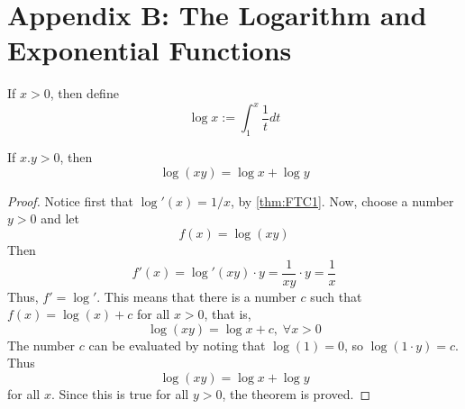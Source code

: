 %
\section*{Appendix B: The Logarithm and Exponential Functions}
%

    
\begin{definition}
    If $x > 0$, then define \begin{equation}
        \log x := \int_1^x\frac{1}{t}dt
    \end{equation}
\end{definition}

\begin{theorem}
    If $x.y > 0$, then \begin{equation}
        \log(xy) = \log x+ \log y
    \end{equation}
\end{theorem}
\begin{proof}
    Notice first that $\log'(x) = 1/x$, by \ref{thm:FTC1}. Now, choose a number $y > 0$ and let \begin{equation*}
        f(x) = \log(xy)
    \end{equation*}
    Then\begin{equation*}
        f'(x) = \log'(xy)\cdot y = \frac{1}{xy}\cdot y = \frac{1}{x}
    \end{equation*}
    Thus, $f' = \log'$. This means that there is a number $c$ such that $f(x) = \log(x) + c$ for all $x > 0$, that is, \begin{equation*}
        \log(xy) = \log x+c,\;\forall x > 0
    \end{equation*}
    The number $c$ can be evaluated by noting that $\log(1) = 0$, so $\log(1\cdot y) = c$. Thus \begin{equation*}
        \log(xy) = \log x + \log y
    \end{equation*}
    for all $x$. Since this is true for all $y > 0$, the theorem is proved.
\end{proof}

